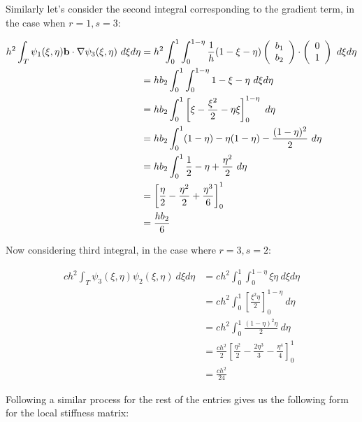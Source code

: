 Similarly let's consider the second integral corresponding to the gradient term,
in the case when $r = 1, s = 3$:

\begin{align*}
    h^2\int_T\psi_1(\xi,\eta)\mathbf{b} \cdot \nabla\psi_3(\xi,\eta)\ d\xi d\eta
     &= h^2\int_0^1\int_0^{1-\eta}\frac{1}{h}(1 - \xi - \eta)
           \left(\begin{array}{c} b_1 \\b_2 \end{array}\right) \cdot
           \left(\begin{array}{c} 0 \\ 1 \end{array}\right)\ d\xi d\eta \\
     &= hb_2\int_0^1\int_0^{1-\eta} 1 - \xi - \eta \ d\xi d\eta \\
     &= hb_2\int_0^1\left[\xi - \frac{\xi^2}{2} - \eta\xi \right]_0^{1-\eta}\ d\eta \\
     &= hb_2\int_0^1(1 -\eta) - \eta(1-\eta) - \frac{(1 - \eta)^2}{2}\ d\eta \\
     &= hb_2\int_0^1\frac{1}{2} -\eta +\frac{\eta^2}{2}\ d\eta \\
     &= \left[\frac{\eta}{2} - \frac{\eta^2}{2} + \frac{\eta^3}{6}\right]_0^1 \\
     &= \frac{hb_2}{6}
\end{align*}

Now considering third integral, in the case where $r = 3, s = 2$:

\begin{align*}
    ch^2\int_T\psi_3(\xi,\eta)\psi_2(\xi,\eta)\ d\xi d\eta
    &= ch^2\int_0^1\int_0^{1-\eta}\xi\eta\ d\xi d\eta \\
    &= ch^2\int_0^1\left[\frac{\xi^2\eta}{2}\right]_0^{1-\eta}\ d\eta \\
    &= ch^2\int_0^1\frac{(1-\eta)^2\eta}{2}\ d\eta \\
    &= \frac{ch^2}{2}\left[\frac{\eta^2}{2} - \frac{2\eta^3}{3} - \frac{\eta^4}{4}\right]_0^1 \\
    &= \frac{ch^2}{24}
\end{align*}

Following a similar process for the rest of the entries gives us the following
form for the local stiffness matrix:

